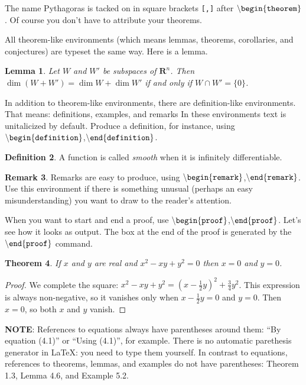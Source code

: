\documentclass[12pt,letterpaper]{amsart}
\newcommand{\RR}{\mathbf R}
\newcommand{\sm}{\setminus}
\newcommand{\bgn}[1]{$\tt {\sm}begin\{#1\}$}
\newcommand{\nd}[1]{$\tt {\sm}end\{#1\}$}
\theoremstyle{plain}
\newtheorem{theorem}{Theorem}[section]
\newtheorem{lemma}[theorem]{Lemma}
\theoremstyle{definition}
\newtheorem{definition}[theorem]{Definition}
\newtheorem{remark}[theorem]{Remark}
\numberwithin{equation}{section}
\begin{document}
The name Pythagoras is tacked on 
in square brackets {\tt [,]} after 
\bgn{theorem}. Of course you don't have to attribute your theorems.

All theorem-like environments (which means lemmas, theorems, corollaries, 
and conjectures) are typeset the same way.  Here is a lemma.

\begin{lemma}
Let $W$ and $W'$ be subspaces of $\RR^n$.  
Then $\dim(W + W') = \dim W + \dim W'$ if and only if 
$W \cap W' = \{0\}$.
\end{lemma}



In addition to theorem-like environments, 
there are definition-like environments. 
That means: definitions, examples, and remarks
In these environments text is unitalicized by default. 
Produce a definition, for instance, using  
\bgn{definition},\nd{definition}.

\begin{definition}
A function is called {\it smooth} when it is infinitely differentiable. 
\end{definition}

\begin{remark}
Remarks are easy to produce, using 
\bgn{remark},\nd{remark}.
Use this 
environment if there is something unusual (perhaps an easy misunderstanding) 
you want to draw to the reader's attention.
\end{remark}


When you want to start and end a proof, use 
\bgn{proof},\nd{proof}.
Let's see how it looks as output.
The box at the end of the proof is generated by the \nd{proof} command.


\begin{theorem}
If $x$ and $y$ are real and $x^2 - xy + y^2 = 0$ then $x = 0$ and 
$y = 0$.
\end{theorem}

\begin{proof}
We complete the square: $x^2 - xy + y^2 = (x - \frac{1}{2}y)^2 + 
\frac{3}{4}y^2$.  This expression is always non-negative, so it 
vanishes only when $x - \frac{1}{2}y = 0$ and $y = 0$.  Then 
$x = 0$, so both $x$ and $y$ vanish. 
\end{proof}


{\bf NOTE}:  References to equations always have parentheses around them: 
``By equation (4.1)'' or ``Using (4.1)'', for example.  There is no automatic parethesis generator 
in LaTeX: you need to type them yourself.  In contrast to equations, references to 
theorems, lemmas, and examples do not have parentheses: 
Theorem 1.3, Lemma 4.6, and Example 5.2.
\end{document}
